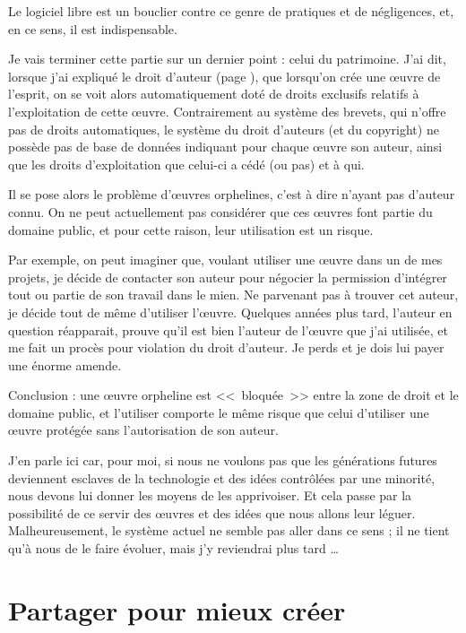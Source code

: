 Le logiciel libre est un bouclier contre ce genre de pratiques et de négligences, et, en ce sens, il est indispensable.

Je vais terminer cette partie sur un dernier point : celui du patrimoine.
J'ai dit, lorsque j'ai expliqué le droit d'auteur (page \pageref{droit-auteur}), que lorsqu'on crée une œuvre de l'esprit, on se voit alors automatiquement doté de droits exclusifs relatifs à l'exploitation de cette œuvre.
Contrairement au système des brevets, qui n'offre pas de droits automatiques, le système du droit d'auteurs (et du copyright) ne possède pas de base de données indiquant pour chaque œuvre son auteur, ainsi que les droits d'exploitation que celui-ci a cédé (ou pas) et à qui.

Il se pose alors le problème d'œuvres orphelines, c'est à dire n'ayant pas d'auteur connu.
On ne peut actuellement pas considérer que ces œuvres font partie du domaine public, et pour cette raison, leur utilisation est un risque.

Par exemple, on peut imaginer que, voulant utiliser une œuvre dans un de mes projets, je décide de contacter son auteur pour négocier la permission d'intégrer tout ou partie de son travail dans le mien.
Ne parvenant pas à trouver cet auteur, je décide tout de même d'utiliser l'œuvre.
Quelques années plus tard, l'auteur en question réapparait, prouve qu'il est bien l'auteur de l'œuvre que j'ai utilisée, et me fait un procès pour violation du droit d'auteur.
Je perds et je dois lui payer une énorme amende.

Conclusion : une œuvre orpheline est <<~bloquée~>> entre la zone de droit et le domaine public, et l'utiliser comporte le même risque que celui d'utiliser une œuvre protégée sans l'autorisation de son 	auteur.

J'en parle ici car, pour moi, si nous ne voulons pas que les générations futures deviennent esclaves de la technologie et des idées contrôlées par une minorité, nous devons lui donner les moyens de les apprivoiser.
Et cela passe par la possibilité de ce servir des œuvres et des idées que nous allons leur léguer.
Malheureusement, le système actuel ne semble pas aller dans ce sens ; il ne tient qu'à nous de le faire évoluer, mais j'y reviendrai plus tard \dots{}

\section{Partager pour mieux créer}

